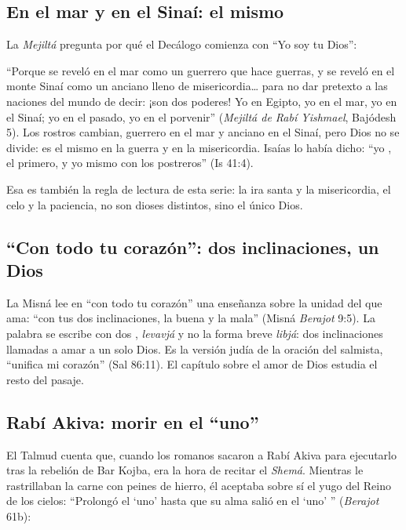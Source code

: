 
\subsection{En el mar y en el Sinaí: el mismo}
La \emph{Mejiltá} pregunta por qué el Decálogo comienza con ``Yo soy \SENOR{} tu Dios'':


``Porque se reveló en el mar como un guerrero que hace guerras, y se reveló en el monte Sinaí como un anciano lleno de misericordia\ldots{} para no dar pretexto a las naciones del mundo de decir: ¡son dos poderes! Yo en Egipto, yo en el mar, yo en el Sinaí; yo en el pasado, yo en el porvenir'' (\emph{Mejiltá de Rabí Yishmael}, Bajódesh 5). Los rostros cambian, guerrero en el mar y anciano en el Sinaí, pero Dios no se divide: es el mismo en la guerra y en la misericordia. Isaías lo había dicho: ``yo \SENOR, el primero, y yo mismo con los postreros'' (Is 41:4).

Esa es también la regla de lectura de esta serie: la ira santa y la misericordia, el celo y la paciencia, no son dioses distintos, sino el único Dios.


\subsection{“Con todo tu corazón”: dos inclinaciones, un Dios}
La Misná lee en ``con todo tu corazón'' una enseñanza sobre la unidad del que ama: ``con tus dos inclinaciones, la buena y la mala'' (Misná \emph{Berajot} 9:5). La palabra  se escribe con dos , \emph{levavjá} y no la forma breve \emph{libjá}: dos inclinaciones llamadas a amar a un solo Dios. Es la versión judía de la oración del salmista, ``unifica mi corazón'' (Sal 86:11). El capítulo sobre el amor de Dios estudia el resto del pasaje.

\subsection{Rabí Akiva: morir en el “uno”}
El Talmud cuenta que, cuando los romanos sacaron a Rabí Akiva para ejecutarlo tras la rebelión de Bar Kojba, era la hora de recitar el \emph{Shemá}. Mientras le rastrillaban la carne con peines de hierro, él aceptaba sobre sí el yugo del Reino de los cielos: ``Prolongó el `uno' hasta que su alma salió en el `uno' '' (\emph{Berajot} 61b):

